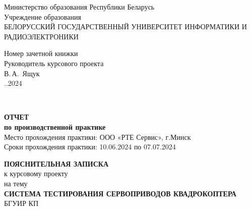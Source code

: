 
\begin{titlepage}
\begin{center}
Министерство образования Республики Беларусь\\[1.2em]
Учреждение образования\\[0.4em]
БЕЛОРУССКИЙ ГОСУДАРСТВЕННЫЙ УНИВЕРСИТЕТ ИНФОРМАТИКИ И РАДИОЭЛЕКТРОНИКИ\\[2.0em]
\end{center}

\begin{flushright}
  \begin{minipage}{0.5\textwidth}
    Номер зачетной книжки\\
    Руководитель курсового проекта\\

    \underline{\hspace*{2.8cm}} В.\,А.~Ящук\\
    \underline{\hspace*{1.4cm}}.\underline{\hspace*{1.4cm}}.2024
  \end{minipage}\\[2em]
\end{flushright}

\begin{center}
\textbf{ОТЧЕТ}\\
\textbf{по производственной практике}\\
Место прохождения практики: ООО «РТЕ Сервис», г.Минск\\
Сроки прохождения практики: 10.06.2024 по 07.07.2024\\
\end{center}

\begin{center}
  \textbf{ПОЯСНИТЕЛЬНАЯ ЗАПИСКА}\\
  к курсовому проекту\\
  на тему\\[2.0em]

  \textbf{СИСТЕМА ТЕСТИРОВАНИЯ СЕРВОПРИВОДОВ КВАДРОКОПТЕРА}\\
  БГУИР КП%
\end{center}


\end{titlepage}
